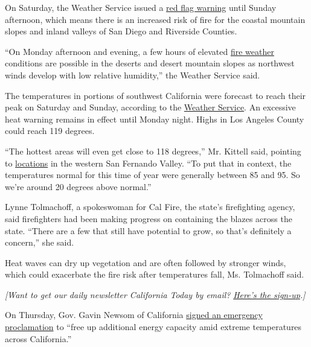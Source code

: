 On Saturday, the Weather Service issued a
\href{https://www.wrh.noaa.gov/fire2/?latitude=33.48\&longitude=-117.02\&latlon=Go\&wfo=sgx\&interface=fwzones}{red
flag warning} until Sunday afternoon, which means there is an increased
risk of fire for the coastal mountain slopes and inland valleys of San
Diego and Riverside Counties.

``On Monday afternoon and evening, a few hours of elevated
\href{https://www.nytimes3xbfgragh.onion/2020/09/10/climate/wildfires-climate-policy.html}{fire
weather} conditions are possible in the deserts and desert mountain
slopes as northwest winds develop with low relative humidity,'' the
Weather Service said.

The temperatures in portions of southwest California were forecast to
reach their peak on Saturday and Sunday, according to the
\href{https://forecast.weather.gov/wwamap/wwatxtget.php?cwa=lox\&wwa=excessive\%20heat\%20warning}{Weather
Service}. An excessive heat warning remains in effect until Monday
night. Highs in Los Angeles County could reach 119 degrees.

``The hottest areas will even get close to 118 degrees,'' Mr. Kittell
said, pointing to
\href{https://forecast.weather.gov/MapClick.php?lat=34.18297270232944\&lon=-118.57088671175165\&site=all\&smap=1\#.X1J_imdKgU0}{locations}
in the western San Fernando Valley. ``To put that in context, the
temperatures normal for this time of year were generally between 85 and
95. So we're around 20 degrees above normal.''

Lynne Tolmachoff, a spokeswoman for Cal Fire, the state's firefighting
agency, said firefighters had been making progress on containing the
blazes across the state. ``There are a few that still have potential to
grow, so that's definitely a concern,'' she said.

Heat waves can dry up vegetation and are often followed by stronger
winds, which could exacerbate the fire risk after temperatures fall, Ms.
Tolmachoff said.

\emph{{[}Want to get our daily newsletter California Today by email?}
\href{http://www.nytimes3xbfgragh.onion/newsletters/california-today}{\emph{Here's
the sign-up}}\emph{.{]}}

On Thursday, Gov. Gavin Newsom of California
\href{https://www.gov.ca.gov/2020/09/03/governor-newsom-signs-emergency-proclamation-to-free-up-additional-energy-capacity-amid-heat-wave/}{signed
an emergency proclamation} to ``free up additional energy capacity amid
extreme temperatures across California.''

